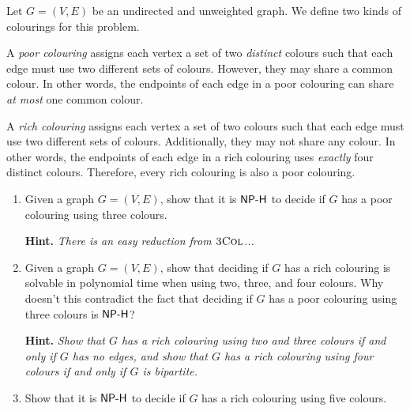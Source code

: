 \documentclass{article}
\begin{document}
\begin{question}
Let $G = (V, E)$ be an undirected and unweighted graph. We define two kinds of colourings for this problem.

A {\em poor colouring} assigns each vertex a set of two {\em distinct} colours such that each edge must use two different sets of colours. However, they may share a common colour. In other words, the endpoints of each edge in a poor colouring can share {\em at most} one common colour.

A {\em rich colouring} assigns each vertex a set of two colours such that each edge must use two different sets of colours. Additionally, they may not share any colour. In other words, the endpoints of each edge in a rich colouring uses {\em exactly} four distinct colours. Therefore, every rich colouring is also a poor colouring.

\begin{enumerate}[label = (\alph*)]
    \item Given a graph $G = (V, E)$, show that it is $\mathsf{NP\text-H}$ to decide if $G$ has a poor colouring using three colours.

    {\bfseries Hint.} {\em There is an easy reduction from $\mathsf{\textsc{3Col}}$...}

    \item Given a graph $G = (V, E)$, show that deciding if $G$ has a rich colouring is solvable in polynomial time when using two, three, and four colours. Why doesn't this contradict the fact that deciding if $G$ has a poor colouring using three colours is $\mathsf{NP\text-H}$?

    {\bfseries Hint.} {\em Show that $G$ has a rich colouring using two and three colours if and only if $G$ has no edges, and show that $G$ has a rich colouring using four colours if and only if $G$ is bipartite.}

    \item Show that it is $\mathsf{NP\text-H}$ to decide if $G$ has a rich colouring using five colours.
\end{enumerate}
\end{question}
\end{document}
